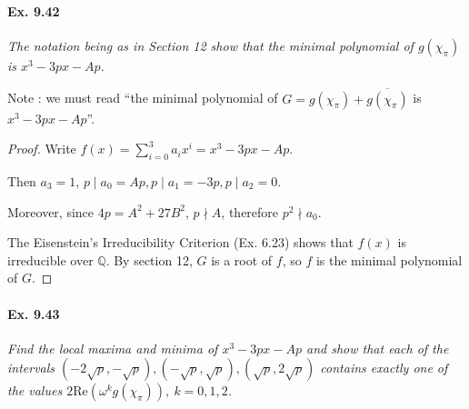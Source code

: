 \documentclass[11pt,a4paper]{article}
\newcommand{\Q}{\mathbb{Q}}
\begin{document}
\paragraph{Ex. 9.42}

{\it The notation being as in Section 12 show that the minimal polynomial of $g(\chi_\pi)$ is $x^3 - 3px-Ap$.
}

Note : we must read ``the minimal polynomial of $G = g(\chi_\pi) + \overline{g(\chi_\pi)}$ is $x^3 - 3px-Ap$''.

\begin{proof}
Write $f(x) = \sum_{i=0}^3 a_i x^i = x^3 - 3px - Ap$.

Then $a_3 = 1$, $p \mid a_0 = Ap, p \mid a_1 = -3p, p\mid a_2 = 0$.

Moreover, since $4p = A^2 + 27 B^2$, $p\nmid A$, therefore $p^2 \nmid a_0$.

The Eisenstein's Irreducibility Criterion (Ex. 6.23) shows that $f(x)$ is irreducible over $\Q$. By section 12, $G$ is a root of $f$, so $f$ is the minimal polynomial of $G$.
\end{proof}


\paragraph{Ex. 9.43}

{\it Find the local maxima and minima of $x^3 - 3px -Ap$ and show that each of the intervals $(-2\sqrt{p}, - \sqrt{p}), (-\sqrt{p},\sqrt{p}), (\sqrt{p},2 \sqrt{p})$ contains exactly one of the values $2 \mathrm{Re}(\omega^k g(\chi_\pi)),\ k=0,1,2$.
}
\end{document}

